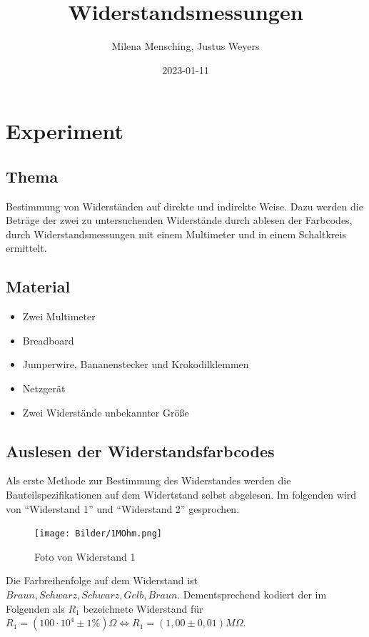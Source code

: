 \documentclass[
  9pt,
]{article}
\title{Widerstandsmessungen}
\author{Milena Mensching, Justus Weyers}
\date{2023-01-11}
\begin{document}
\maketitle

\hypertarget{experiment}{%
\section{Experiment}\label{experiment}}

\hypertarget{thema}{%
\subsection{Thema}\label{thema}}

Bestimmung von Widerständen auf direkte und indirekte Weise. Dazu werden
die Beträge der zwei zu untersuchenden Widerstände durch ablesen der
Farbcodes, durch Widerstandsmessungen mit einem Multimeter und in einem
Schaltkreis ermittelt.

\hypertarget{material}{%
\subsection{Material}\label{material}}

\begin{itemize}
\item{Zwei Multimeter}
\item{Breadboard}
\item{Jumperwire, Bananenstecker und Krokodilklemmen}
\item{Netzgerät}
\item{Zwei Widerstände unbekannter Größe}
\end{itemize}

\hypertarget{auslesen-der-widerstandsfarbcodes}{%
\subsection{Auslesen der
Widerstandsfarbcodes}\label{auslesen-der-widerstandsfarbcodes}}

Als erste Methode zur Bestimmung des Widerstandes werden die
Bauteilspezifikationen auf dem Widertstand selbst abgelesen. Im
folgenden wird von ``Widerstand 1'' und ``Widerstand 2'' gesprochen.

\begin{figure}
\centering
\texttt{[image: Bilder/1MOhm.png]}
\caption{Foto von Widerstand 1}
\end{figure}

Die Farbreihenfolge auf dem Widerstand ist
\(Braun, Schwarz, Schwarz, Gelb, Braun\). Dementsprechend kodiert der im
Folgenden als \(R_1\) bezeichnete Widerstand für
\(R_1 = (100 \cdot 10^4\pm 1\% ) \Omega \Leftrightarrow R_1=(1,00\pm 0,01) M\Omega\).
\end{document}
